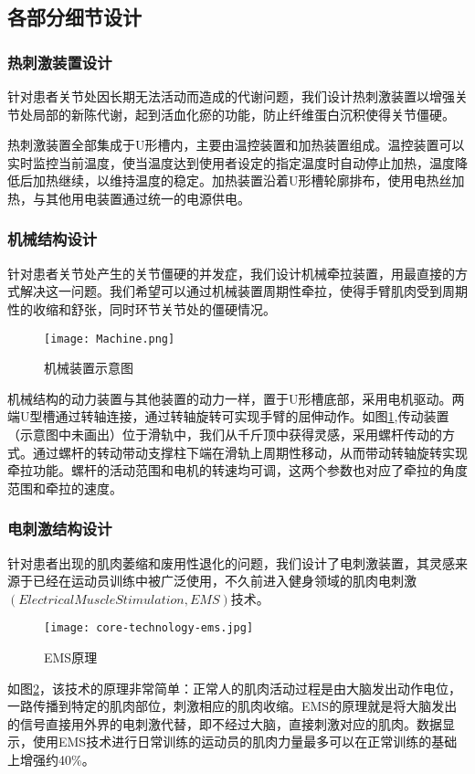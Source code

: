 \documentclass[UTF8]{ctexart}
\begin{document}
    \subsection{各部分细节设计}
        \subsubsection{热刺激装置设计}
            针对患者关节处因长期无法活动而造成的代谢问题，我们设计热刺激装置以增强关节处局部的新陈代谢，起到活血化瘀的功能，防止纤维蛋白沉积使得关节僵硬。

            热刺激装置全部集成于U形槽内，主要由温控装置和加热装置组成。温控装置可以实时监控当前温度，使当温度达到使用者设定的指定温度时自动停止加热，温度降低后加热继续，以维持温度的稳定。加热装置沿着U形槽轮廓排布，使用电热丝加热，与其他用电装置通过统一的电源供电。
        \subsubsection{机械结构设计}
            针对患者关节处产生的关节僵硬的并发症，我们设计机械牵拉装置，用最直接的方式解决这一问题。我们希望可以通过机械装置周期性牵拉，使得手臂肌肉受到周期性的收缩和舒张，同时环节关节处的僵硬情况。
            \begin{figure}[H]
                \centering
                \texttt{[image: Machine.png]}
                \caption{机械装置示意图}
                \label{fig:Machine}
            \end{figure}

            机械结构的动力装置与其他装置的动力一样，置于U形槽底部，采用电机驱动。两端U型槽通过转轴连接，通过转轴旋转可实现手臂的屈伸动作。如图\ref{fig:Machine},传动装置（示意图中未画出）位于滑轨中，我们从千斤顶中获得灵感，采用螺杆传动的方式。通过螺杆的转动带动支撑柱下端在滑轨上周期性移动，从而带动转轴旋转实现牵拉功能。螺杆的活动范围和电机的转速均可调，这两个参数也对应了牵拉的角度范围和牵拉的速度。
        \subsubsection{电刺激结构设计}
            针对患者出现的肌肉萎缩和废用性退化的问题，我们设计了电刺激装置，其灵感来源于已经在运动员训练中被广泛使用，不久前进入健身领域的肌肉电刺激$(Electrical Muscle Stimulation,EMS)$技术。\cite{wiki}

            \begin{figure}[H]
                \centering
                \texttt{[image: core-technology-ems.jpg]}
                \caption{EMS原理}
                \label{fig:EMS}
            \end{figure}
            如图\ref{fig:EMS}，该技术的原理非常简单：正常人的肌肉活动过程是由大脑发出动作电位，一路传播到特定的肌肉部位，刺激相应的肌肉收缩。EMS的原理就是将大脑发出的信号直接用外界的电刺激代替，即不经过大脑，直接刺激对应的肌肉。数据显示，使用EMS技术进行日常训练的运动员的肌肉力量最多可以在正常训练的基础上增强约40\%。
\end{document}
